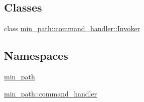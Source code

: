 \subsection*{Classes}
\begin{DoxyCompactItemize}
\item 
class \hyperlink{a00009}{min\+\_\+path\+::command\+\_\+handler\+::\+Invoker}
\end{DoxyCompactItemize}
\subsection*{Namespaces}
\begin{DoxyCompactItemize}
\item 
 \hyperlink{a00033}{min\+\_\+path}
\item 
 \hyperlink{a00035}{min\+\_\+path\+::command\+\_\+handler}
\end{DoxyCompactItemize}
